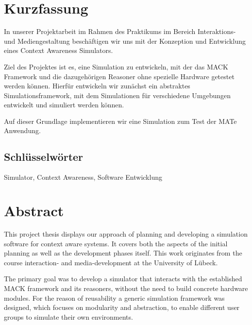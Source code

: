 \documentclass[11pt,    %
  english,ngerman,      %
  paper=a4,             %
  oneside,              %
  tablecaptionbelow,    %
  DIV=calc              %
  ]{scrbook}            %
\newcommand{\imiscomment}[1]{\textit{\color{imiscommentcolor}#1}}
\begin{document}
\chapter*{Kurzfassung}
\thispagestyle{empty}

In unserer Projektarbeit im Rahmen des Praktikums im Bereich Interaktions- und Mediengestaltung beschäftigen wir uns mit der Konzeption und Entwicklung eines Context Awareness Simulators.

Ziel des Projektes ist es, eine Simulation zu entwickeln, mit der das MACK Framework und die dazugehörigen Reasoner ohne spezielle Hardware getestet werden können. Hierfür entwickeln wir zunächst ein abstraktes Simulationsframework, mit dem Simulationen für verschiedene Umgebungen entwickelt und simuliert werden können.

Auf dieser Grundlage implementieren wir eine Simulation zum Test der MATe Anwendung.

\vfill

\section*{Schlüsselwörter} Simulator, Context Awareness, Software Entwicklung


\chapter*{Abstract}
\thispagestyle{empty}

This project thesis displays our approach of planning and developing a simulation software for context aware systems. It covers both the aspects of the initial planning as well as the development phases itself.
This work originates from the course interaction- and media-development at the University of Lübeck.

The primary goal was to develop a simulator that interacts with the established MACK framework and its reasoners, without the need to build concrete hardware modules.
For the reason of reusability a generic simulation framework was designed, which focuses on modularity and abstraction, to enable  different user groups to simulate their own environments.
\end{document}
